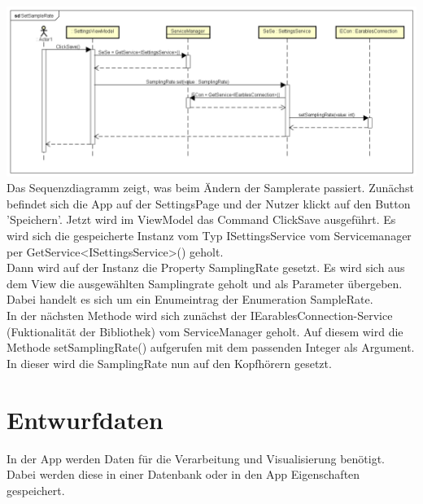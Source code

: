 \documentclass[a4paper,12pt]{article}
\begin{document}
\includegraphics[width=1.1\textwidth]{./Diagramme/SetSampleRateSeqDia.png}\\
Das Sequenzdiagramm zeigt, was beim Ändern der Samplerate passiert.
Zunächst befindet sich die App auf der SettingsPage und der Nutzer klickt auf den Button 'Speichern'. Jetzt wird im ViewModel das Command ClickSave ausgeführt. Es wird sich die gespeicherte Instanz vom Typ ISettingsService vom Servicemanager per GetService<ISettingsService>() geholt.\\
Dann wird auf der Instanz die Property SamplingRate gesetzt. Es wird sich aus dem View die ausgewählten Samplingrate geholt und als Parameter übergeben. Dabei handelt es sich um ein Enumeintrag der Enumeration SampleRate.\\
In der nächsten Methode wird sich zunächst der IEarablesConnection-Service (Fuktionalität der Bibliothek) vom ServiceManager geholt. 
Auf diesem wird die Methode setSamplingRate() aufgerufen mit dem passenden Integer als Argument.
In dieser wird die SamplingRate nun auf den Kopfhörern gesetzt.\\
\newpage
\section{Entwurfdaten}
In der App werden Daten für die Verarbeitung und Visualisierung benötigt. Dabei werden diese in einer Datenbank oder in den App Eigenschaften gespeichert.
\end{document}
